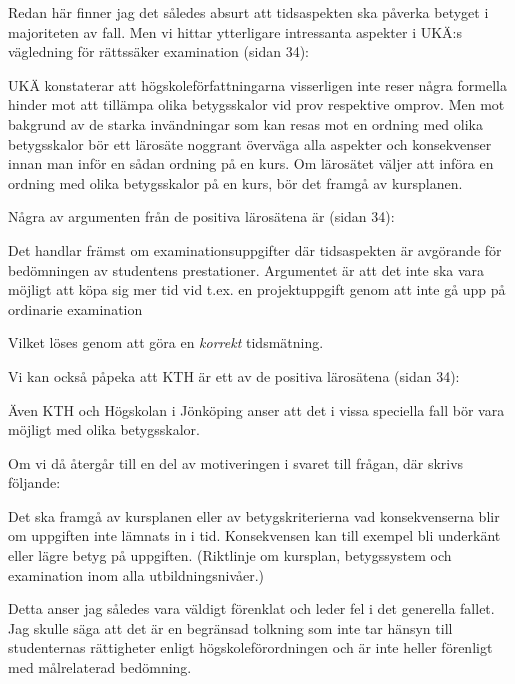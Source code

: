 Redan här finner jag det således absurt att tidsaspekten ska påverka
betyget i majoriteten av fall. Men vi hittar ytterligare intressanta
aspekter i UKÄ:s vägledning för rättssäker examination (sidan 34):

UKÄ konstaterar att högskoleförfattningarna visserligen inte reser några
formella hinder mot att tillämpa olika betygsskalor vid prov respektive
omprov. Men mot bakgrund av de starka invändningar som kan resas mot en
ordning med olika betygsskalor bör ett lärosäte noggrant överväga alla
aspekter och konsekvenser innan man inför en sådan ordning på en kurs.
Om lärosätet väljer att införa en ordning med olika betygsskalor på en
kurs, bör det framgå av kursplanen.

Några av argumenten från de positiva lärosätena är (sidan 34):

Det handlar främst om examinationsuppgifter där tidsaspekten är
avgörande för bedömningen av studentens prestationer. Argumentet är att
det inte ska vara möjligt att köpa sig mer tid vid t.ex. en
projektuppgift genom att inte gå upp på ordinarie examination

Vilket löses genom att göra en \emph{korrekt} tidsmätning.

Vi kan också påpeka att KTH är ett av de positiva lärosätena (sidan 34):

Även KTH och Högskolan i Jönköping anser att det i vissa speciella fall
bör vara möjligt med olika betygsskalor.

Om vi då återgår till en del av motiveringen i svaret till frågan, där
skrivs följande:

Det ska framgå av kursplanen eller av betygskriterierna vad
konsekvenserna blir om uppgiften inte lämnats in i tid. Konsekvensen kan
till exempel bli underkänt eller lägre betyg på uppgiften. (Riktlinje om
kursplan, betygssystem och examination inom alla utbildningsnivåer.)

Detta anser jag således vara väldigt förenklat och leder fel i det
generella fallet. Jag skulle säga att det är en begränsad tolkning som
inte tar hänsyn till studenternas rättigheter enligt
högskoleförordningen och är inte heller förenligt med målrelaterad
bedömning.
